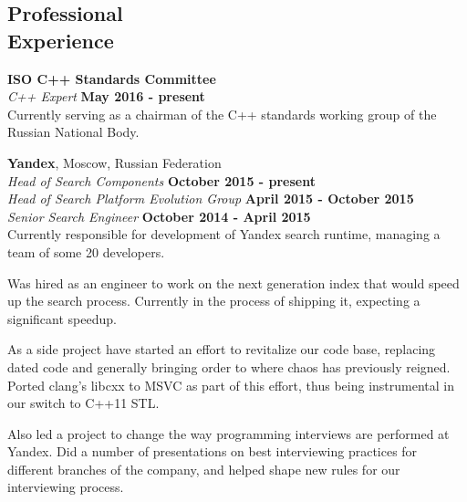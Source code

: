 \documentclass[margin,line]{CV}
\begin{document}
\begin{resume}
    
    
    \section{\mysidestyle Professional\\Experience}
    \textbf{ISO C++ Standards Committee} \vspace{2mm}\\\vspace{1mm}%
    \textsl{C++ Expert} \hfill \textbf{May 2016 - present}\\\vspace{1mm}%
    Currently serving as a chairman of the C++ standards working group of the Russian National Body.
   
    
    \textbf{Yandex}, Moscow, Russian Federation \vspace{2mm}\\\vspace{1mm}%
    \textsl{Head of Search Components} \hfill \textbf{October 2015 - present}\\\vspace{1mm}%
    \textsl{Head of Search Platform Evolution Group} \hfill \textbf{April 2015 - October 2015}\\\vspace{1mm}%
    \textsl{Senior Search Engineer} \hfill \textbf{October 2014 - April 2015}\\
    Currently responsible for development of Yandex search runtime, managing a team of some 20 developers.
    
    Was hired as an engineer to work on the next generation index that would speed up the search process. Currently in the process of shipping it, expecting a significant speedup.

    As a side project have started an effort to revitalize our code base, replacing dated code and generally bringing order to where chaos has previously reigned. Ported clang's libcxx to MSVC as part of this effort, thus being instrumental in our switch to C++11 STL.

    Also led a project to change the way programming interviews are performed at Yandex. Did a number of presentations on best interviewing practices for different branches of the company, and helped shape new rules for our interviewing process.


\end{resume}
\end{document}
